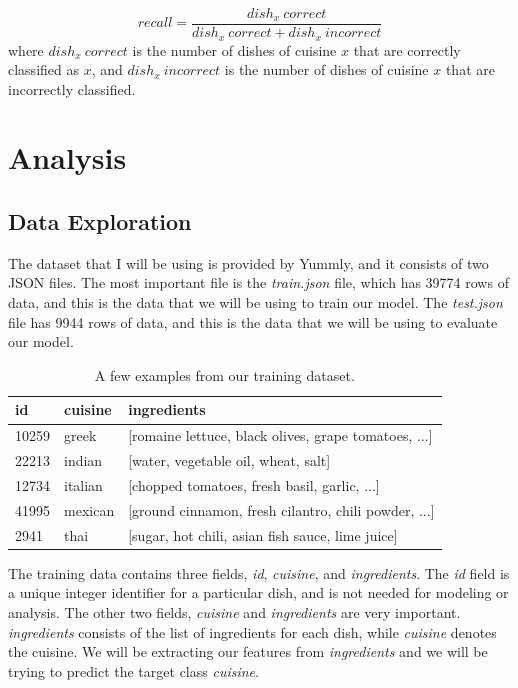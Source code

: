 \documentclass[12pt]{article}
\begin{document}
\begin{equation}
recall = \frac{\textit{$dish_x\: correct$}}{\textit{$dish_x\: correct$} + \textit{$dish_x\: incorrect$}}
\end{equation}
%
where $dish_x\: correct$ is the number of dishes of cuisine $x$ that are correctly classified as $x$, and $dish_x\: incorrect$ is the number of dishes of cuisine $x$ that are incorrectly classified.

\section{Analysis}
\subsection{Data Exploration}
The dataset that I will be using is provided by Yummly, and it consists of two JSON files. The most important file is the \textit{train.json} file, which has 39774 rows of data, and this is the data that we will be using to train our model. The \textit{test.json} file has 9944 rows of data, and this is the data that we will be using to evaluate our model.

\begin{table}[H]
\begin{tabular}{|l|l|l|}
\hline
\textbf{id} & \textbf{cuisine} & \textbf{ingredients}                                     \\ \hline
10259       & greek            & {[}romaine lettuce, black olives, grape tomatoes, ...{]} \\ \hline
22213       & indian           & {[}water, vegetable oil, wheat, salt{]}                  \\ \hline
12734       & italian          & {[}chopped tomatoes, fresh basil, garlic, ...{]}         \\ \hline
41995       & mexican          & {[}ground cinnamon, fresh cilantro, chili powder, ...{]} \\ \hline
2941        & thai             & {[}sugar, hot chili, asian fish sauce, lime juice{]}     \\ \hline
\end{tabular}
\caption{A few examples from our training dataset.}
\end{table}

\noindent
The training data contains three fields, \textit{id}, \textit{cuisine}, and \textit{ingredients}. The \textit{id} field is a unique integer identifier for a particular dish, and is not needed for modeling or analysis. The other two fields, \textit{cuisine} and \textit{ingredients}  are very important. \textit{ingredients} consists of the list of ingredients for each dish, while \textit{cuisine} denotes the cuisine. We will be extracting our features from \textit{ingredients} and we will be trying to predict the target class \textit{cuisine}.
\end{document}
